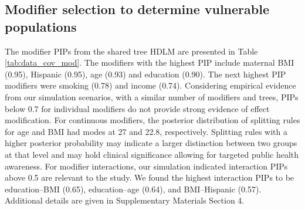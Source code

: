 \documentclass[12pt]{article}
\begin{document}





\subsection{Modifier selection to determine vulnerable populations}\label{sec:data_mod_sel}

The modifier PIPs from the shared tree HDLM are presented in Table \ref{tab:data_cov_mod}. The modifiers with the highest PIP include maternal BMI (0.95), Hispanic (0.95), age (0.93) and education (0.90). The next highest PIP modifiers were smoking (0.78) and income (0.74). Considering empirical evidence from our simulation scenarios, with a similar number of modifiers and trees, PIPs below 0.7 for individual modifiers do not provide strong evidence of effect modification. For continuous modifiers, the posterior distribution of splitting rules for age and BMI had modes at 27 and 22.8, respectively. Splitting rules with a higher posterior probability may indicate a larger distinction between two groups at that level and may hold clinical significance allowing for targeted public health awareness. For modifier interactions, our simulation indicated interaction PIPs above 0.5 are relevant to the study. We found the highest interaction PIPs to be education--BMI (0.65), education--age (0.64), and BMI--Hispanic (0.57). Additional details are given in Supplementary Materials Section 4.
\end{document}
